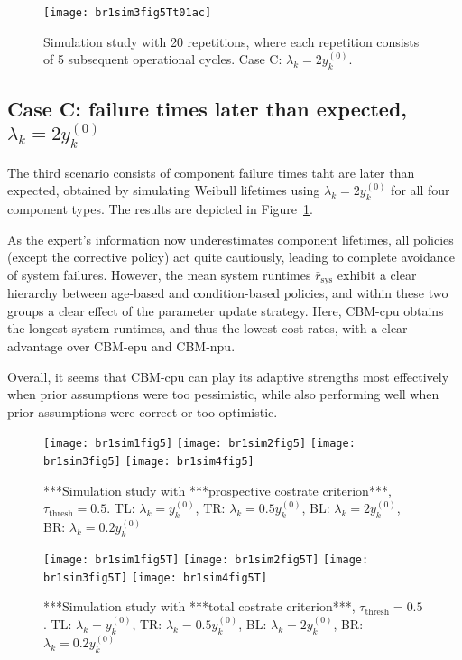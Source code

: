 \documentclass[authoryear]{elsarticle}
\newcommand{\uz}{^{(0)}} %
\def\ykz{y\uz_k}
\newcommand{\tthresh}{\tau_{\text{thresh}}}
\newcommand{\mrsys}{\bar{r}_\text{sys}}
\begin{document}
\begin{figure}
\texttt{[image: br1sim3fig5Tt01ac]}
\caption{Simulation study with 20 repetitions, where each repetition consists of 5 subsequent operational cycles.
Case C: $\lambda_k = 2\ykz$.}
\label{fig:br1sim3fig5Tt01}
\end{figure}

\subsection{Case C: failure times later than expected, $\lambda_k = 2 \ykz$}
\label{sec:case3}

The third scenario consists of component failure times taht are later than expected,
obtained by simulating Weibull lifetimes using $\lambda_k = 2 \ykz$ for all four component types.
The results are depicted in Figure~\ref{fig:br1sim3fig5Tt01}.

As the expert's information now underestimates component lifetimes,
all policies (except the corrective policy) act quite cautiously,
leading to complete avoidance of system failures.
However, the mean system runtimes $\mrsys$ exhibit
a clear hierarchy between age-based and condition-based policies,
and within these two groups a clear effect of the parameter update strategy.
Here, CBM-cpu obtains the longest system runtimes, and thus the lowest cost rates,
with a clear advantage over CBM-epu and CBM-npu.

Overall, it seems that CBM-cpu can play its adaptive strengths most effectively
when prior assumptions were too pessimistic,
while also performing well when prior assumptions were correct or too optimistic.


\iffalse
\begin{figure}
\texttt{[image: br1sim1fig5]}
\texttt{[image: br1sim2fig5]}
\texttt{[image: br1sim3fig5]}
\texttt{[image: br1sim4fig5]}
\caption{***Simulation study with ***prospective costrate criterion***, $\tthresh = 0.5$.
TL: $\lambda_k =     \ykz$,
TR: $\lambda_k = 0.5 \ykz$,
BL: $\lambda_k = 2   \ykz$,
BR: $\lambda_k = 0.2 \ykz$}
\label{fig:simprospcostrate05}
\end{figure}

\begin{figure}
\texttt{[image: br1sim1fig5T]}
\texttt{[image: br1sim2fig5T]}
\texttt{[image: br1sim3fig5T]}
\texttt{[image: br1sim4fig5T]}
\caption{***Simulation study with ***total costrate criterion***, $\tthresh = 0.5$.
TL: $\lambda_k =     \ykz$,
TR: $\lambda_k = 0.5 \ykz$,
BL: $\lambda_k = 2   \ykz$,
BR: $\lambda_k = 0.2 \ykz$}
\label{fig:simtotalcostrate05}
\end{figure}
\end{document}
